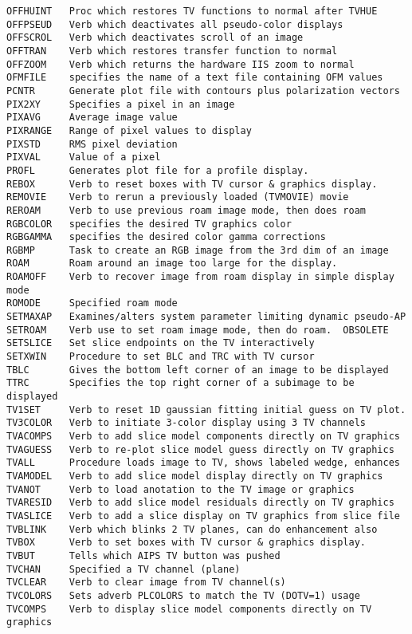\begin{verbatim}
OFFHUINT   Proc which restores TV functions to normal after TVHUE
OFFPSEUD   Verb which deactivates all pseudo-color displays
OFFSCROL   Verb which deactivates scroll of an image
OFFTRAN    Verb which restores transfer function to normal
OFFZOOM    Verb which returns the hardware IIS zoom to normal
OFMFILE    specifies the name of a text file containing OFM values
PCNTR      Generate plot file with contours plus polarization vectors
PIX2XY     Specifies a pixel in an image
PIXAVG     Average image value
PIXRANGE   Range of pixel values to display
PIXSTD     RMS pixel deviation
PIXVAL     Value of a pixel
PROFL      Generates plot file for a profile display.
REBOX      Verb to reset boxes with TV cursor & graphics display.
REMOVIE    Verb to rerun a previously loaded (TVMOVIE) movie
REROAM     Verb to use previous roam image mode, then does roam
RGBCOLOR   specifies the desired TV graphics color
RGBGAMMA   specifies the desired color gamma corrections
RGBMP      Task to create an RGB image from the 3rd dim of an image
ROAM       Roam around an image too large for the display.
ROAMOFF    Verb to recover image from roam display in simple display mode
ROMODE     Specified roam mode
SETMAXAP   Examines/alters system parameter limiting dynamic pseudo-AP
SETROAM    Verb use to set roam image mode, then do roam.  OBSOLETE
SETSLICE   Set slice endpoints on the TV interactively
SETXWIN    Procedure to set BLC and TRC with TV cursor
TBLC       Gives the bottom left corner of an image to be displayed
TTRC       Specifies the top right corner of a subimage to be displayed
TV1SET     Verb to reset 1D gaussian fitting initial guess on TV plot.
TV3COLOR   Verb to initiate 3-color display using 3 TV channels
TVACOMPS   Verb to add slice model components directly on TV graphics
TVAGUESS   Verb to re-plot slice model guess directly on TV graphics
TVALL      Procedure loads image to TV, shows labeled wedge, enhances
TVAMODEL   Verb to add slice model display directly on TV graphics
TVANOT     Verb to load anotation to the TV image or graphics
TVARESID   Verb to add slice model residuals directly on TV graphics
TVASLICE   Verb to add a slice display on TV graphics from slice file
TVBLINK    Verb which blinks 2 TV planes, can do enhancement also
TVBOX      Verb to set boxes with TV cursor & graphics display.
TVBUT      Tells which AIPS TV button was pushed
TVCHAN     Specified a TV channel (plane)
TVCLEAR    Verb to clear image from TV channel(s)
TVCOLORS   Sets adverb PLCOLORS to match the TV (DOTV=1) usage
TVCOMPS    Verb to display slice model components directly on TV graphics

\end{verbatim}
